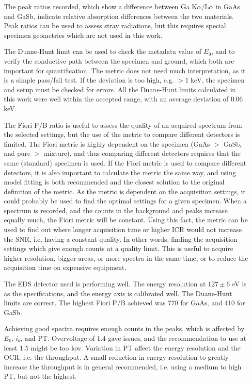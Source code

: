 The peak ratios recorded, which show a difference between Ga K$\alpha$/L$\alpha$ in GaAs and GaSb, indicate relative absorption differences between the two materials.
Peak ratios can be used to assess stray radiations, but this requires special specimen geometries which are not used in this work.

The Duane-Hunt limit can be used to check the metadata value of $E_0$, and to verify the conductive path between the specimen and ground, which both are important for quantification.
The metric does not need much interpretation, as it is a simple pass/fail test.
If the deviation is too high, e.g. $>1$ keV, the specimen and setup must be checked for errors.
All the Duane-Hunt limits calculated in this work were well within the accepted range, with an average deviation of $0.06$ keV.

The Fiori P/B ratio is useful to assess the quality of an acquired spectrum from the selected settings, but the use of the metric to compare different detectors is limited.
The Fiori metric is highly dependent on the specimen (GaAs $>$ GaSb, and pure $>$ mixture), and thus comparing different detectors requires that the same (standard) specimen is used.
If the Fiori metric is used to compare different detectors, it is also important to calculate the metric the same way, and using model fitting is both recommended and the closest solution to the original definition of the metric.
As the metric is dependent on the acquisition settings, it could probably be used to find the optimal settings for a given specimen.
When a spectrum is recorded, and the counts in the background and peaks increase equally much, the Fiori metric will be constant.
Using this fact, the metric can be used to find out where longer acquisition time or higher ICR would not increase the SNR, i.e. having a constant quality.
In other words, finding the acquisition settings which give enough counts at a quality limit.
This is useful to acquire higher resolution, bigger areas, or more spectra in the same time, or to reduce the acquisition time on expensive equipment.


The EDS detector used is performing well.
The energy resolution at $127 \pm6$ eV is as the specifications, and the energy axis is calibrated well.
The Duane-Hunt limits are correct.
The highest Fiori P/B achieved was 770 for GaAs, and 410 for GaSb.

Achieving good spectra requires enough counts in the peaks, which is affected by $E_0$, $i_b$, and PT.
Overvoltage of $1.4$ gave issues, and the recommendation to use at least $1.5$ might be too low.
Variation in PT affect the energy resolution and the OCR, i.e. the throughput.
A small reduction in energy resolution to greatly increase the throughput is in general recommended, i.e. using a medium to high PT, but not the highest.





